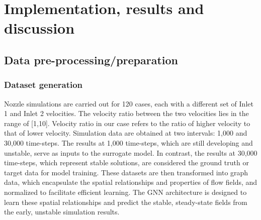 \chapter{Implementation, results and discussion}
\label{chap:Method}
\section{Data pre-processing/preparation}
\subsection{Dataset generation}
Nozzle simulations are carried out for 120 cases, each with a different set of Inlet 1 and Inlet 2 velocities. The velocity ratio between the two velocities lies in the range of [1,10]. Velocity ratio in our case refers to the ratio of higher velocity to that of lower velocity.
Simulation data are obtained at two intervals: 1,000 and 30,000 time-steps. The results at 1,000 time-steps, which are still developing and unstable, serve as inputs to the surrogate model. In contrast, the results at 30,000 time-steps, which represent stable solutions, are considered the ground truth or target data for model training. These datasets are then transformed into graph data, which encapsulate the spatial relationships and properties of flow fields, and normalized to facilitate efficient learning. The GNN architecture is designed to learn these spatial relationships and predict the stable, steady-state fields from the early, unstable simulation results.
